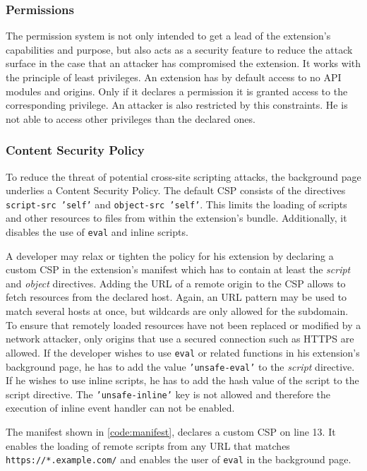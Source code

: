\subsubsection{Permissions}

	The permission system is not only intended to get a lead of the extension's capabilities and purpose, but also acts as a security feature to reduce the attack surface in the case that an attacker has compromised the extension. It works with the principle of least privileges. An extension has by default access to no API modules and origins. Only if it declares a permission it is granted access to the corresponding privilege. An attacker is also restricted by this constraints. He is not able to access other privileges than the declared ones. 
	
\subsubsection{Content Security Policy}

	To reduce the threat of potential cross-site scripting attacks, the background page underlies a Content Security Policy. The default CSP consists of the directives \texttt{script-src 'self'} and \texttt{object-src 'self'}. This limits the loading of scripts and other resources to files from within the extension's bundle. Additionally, it disables the use of \texttt{eval} and inline scripts.  
	
	A developer may relax or tighten the policy for his extension by declaring a custom CSP in the extension's manifest which has to contain at least the \textit{script} and \textit{object} directives. Adding the URL of a remote origin to the CSP allows to fetch resources from the declared host. Again, an URL pattern may be used to match several hosts at once, but wildcards are only allowed for the subdomain. To ensure that remotely loaded resources have not been replaced or modified by a network attacker, only origins that use a secured connection such as HTTPS are allowed. If the developer wishes to use \texttt{eval} or related functions in his extension's background page, he has to add the value \texttt{'unsafe-eval'} to the \textit{script} directive. If he wishes to use inline scripts, he has to add the hash value of the script to the script directive. The \texttt{'unsafe-inline'} key is not allowed and therefore the execution of inline event handler can not be enabled. 
	
	The manifest shown in \autoref{code:manifest}, declares a custom CSP on line 13. It enables the loading of remote scripts from any URL that matches \texttt{https://*.example.com/} and enables the user of \texttt{eval} in the background page.

